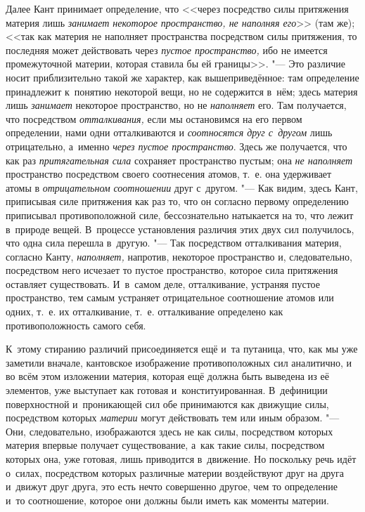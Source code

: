 Далее Кант принимает определение, что <<через посредство силы притяжения
материя лишь {\em занимает некоторое пространство, не
наполняя его}>> (там же); <<так как материя не наполняет пространства
посредством силы притяжения, то последняя может действовать через
{\em пустое пространство,} ибо не имеется промежуточной
материи, которая ставила бы ей границы>>. "--- Это различие носит
приблизительно такой же характер, как вышеприведённое: там определение
принадлежит к~понятию некоторой вещи, но не содержится в~нём; здесь материя
лишь {\em занимает} некоторое пространство, но не
{\em наполняет} его. Там получается, что посредством
{\em отталкивания,} если мы остановимся на его первом
определении, нами одни отталкиваются и {\em соотносятся
друг с~другом} лишь отрицательно, а~именно {\em через
пустое пространство}. Здесь же получается, что как раз
{\em притягательная сила} сохраняет пространство
пустым; она {\em не наполняет} пространство посредством
своего соотнесения атомов, т.~е. она удерживает атомы в {\em отрицательном}
{\em соотношении} друг с~другом. "--- Как видим, здесь
Кант, приписывая силе притяжения как раз то, что он согласно первому
определению приписывал противоположной силе, бессознательно натыкается на
то, что лежит в~природе вещей. В~процессе установления различия этих двух
сил получилось, что одна сила перешла в~другую. "--- Так посредством
отталкивания материя, согласно Канту, {\em наполняет,}
напротив, некоторое пространство и, следовательно, посредством него
исчезает то пустое пространство, которое сила притяжения оставляет
существовать. И~в~самом деле, отталкивание, устраняя пустое пространство,
тем самым устраняет отрицательное соотношение атомов или одних, т.~е. их
отталкивание, т.~е. отталкивание определено как противоположность самого себя.

К~этому стиранию различий присоединяется ещё и~та путаница, что, как мы уже
заметили вначале, кантовское изображение противоположных сил аналитично, и
во всём этом изложении материя, которая ещё должна быть выведена из её
элементов, уже выступает как готовая и~конституированная. В~дефиниции
поверхностной и~проникающей сил обе принимаются как движущие силы,
посредством которых {\em материи} могут действовать тем
или иным образом. "--- Они, следовательно, изображаются здесь не как силы,
посредством которых материя впервые получает существование, а~как такие
силы, посредством которых она, уже готовая, лишь приводится в~движение. Но
поскольку речь идёт о~силах, посредством которых различные материи
воздействуют друг на друга и~движут друг друга, это есть нечто совершенно
другое, чем то определение и~то соотношение, которое они должны были иметь
как моменты материи.

